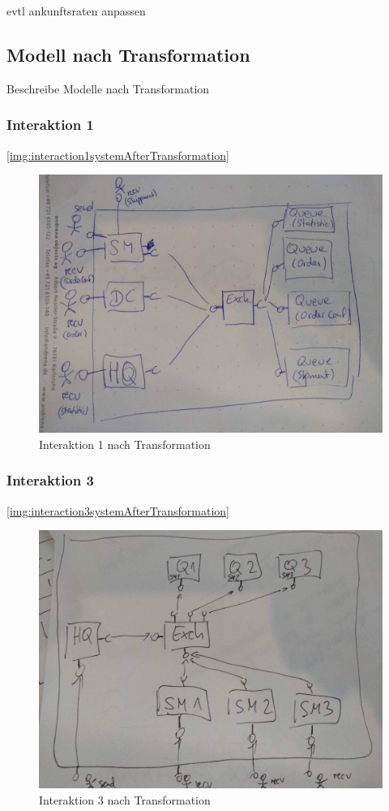 evtl ankunftsraten anpassen

\subsection{Modell nach Transformation}
Beschreibe Modelle nach Transformation \\
\subsubsection{Interaktion 1}
\autoref{img:interaction1systemAfterTransformation}
\begin{figure}
\center
  \includegraphics[width=1\textwidth]{images/evaluation/specjms/interaction1system.png}
  \caption{Interaktion 1 nach Transformation}
  \label{img:interaction1systemAfterTransformation}
\end{figure}
\subsubsection{Interaktion 3}
\autoref{img:interaction3systemAfterTransformation}
\begin{figure}
\center
  \includegraphics[width=1\textwidth]{images/evaluation/specjms/interaction3system.png}
  \caption{Interaktion 3 nach Transformation}
  \label{img:interaction3systemAfterTransformation}
\end{figure}


